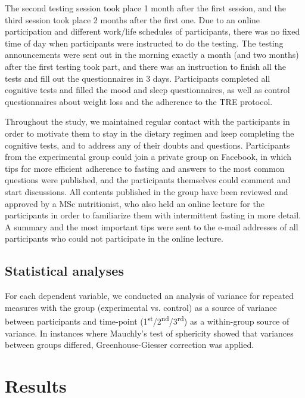 \documentclass[authordate, empirical,issue]{jote-new-article}
\begin{document}
The second testing session took place 1 month after the first session, and the third session took place 2 months after the first one. Due to an online participation and different work/life schedules of participants, there was no fixed time of day when participants were instructed to do the testing. The testing announcements were sent out in the morning exactly a month (and two months) after the first testing took part, and there was an instruction to finish all the tests and fill out the questionnaires in 3 days. Participants completed all cognitive tests and filled the mood and sleep questionnaires, as well as control questionnaires about weight loss and the adherence to the TRE protocol.



Throughout the study, we maintained regular contact with the participants in order to motivate them to stay in the dietary regimen and keep completing the cognitive tests, and to address any of their doubts and questions. Participants from the experimental group could join a private group on Facebook, in which tips for more efficient adherence to fasting and answers to the most common questions were published, and the participants themselves could comment and start discussions. All contents published in the group have been reviewed and approved by a MSc nutritionist, who also held an online lecture for the participants in order to familiarize them with intermittent fasting in more detail. A summary and the most important tips were sent to the e-mail addresses of all participants who could not participate in the online lecture.


\subsection{Statistical analyses}

For each dependent variable, we conducted an analysis of variance for repeated measures with the group (experimental vs. control) as a source of variance between participants and time-point (1\textsuperscript{st}/2\textsuperscript{nd}/3\textsuperscript{rd}) as a within-group source of variance. In instances where Mauchly's test of sphericity showed that variances between groups differed, Greenhouse-Giesser correction was applied.


\section{Results }
\end{document}
